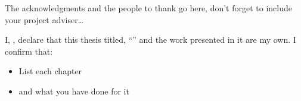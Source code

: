 \documentclass[
12pt, %
oneside, %
english, %
onehalfpacing, %
]{McMasterThesis} %
\begin{document}
\begin{acknowledgements}
\addchaptertocentry{\acknowledgementname} %

The acknowledgments and the people to thank go here, don't forget to include your project adviser\ldots

\end{acknowledgements}


\tableofcontents %

\listoffigures %

\listoftables %



\begin{declaration}
\addchaptertocentry{\authorshipname}

\noindent I, \authorname, declare that this thesis titled, \enquote{\ttitle} and the work presented in it are my own. I confirm that:

\begin{itemize} 
\item List each chapter
\item and what you have done for it
\end{itemize}
 
\end{declaration}


\end{document}
